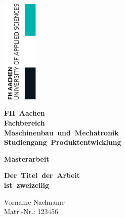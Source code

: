 \begin{titlepage}

	\thispagestyle{empty}

	\begin{flushright}
		\includegraphics[width=1.7cm]{./pic/FHAC.jpg}
	\end{flushright}

	\vspace{-2.5cm}

	\centering \bfseries \Large FH~Aachen \\
	\vspace{0.5cm}
	\normalsize Fachbereich\\
	Maschinenbau~und~Mechatronik \\
	Studiengang~Produktentwicklung

	\vspace{1cm}

	\centering \bfseries Masterarbeit

	\vspace{0.8cm}

	\centering \begin{minipage}[t]{17cm}
		\centering \bfseries \large Der~Titel~der~Arbeit\\ ist~zweizeilig
		\medskip
	\end{minipage}

	\vspace{1.5cm}

	\begin{minipage}[t]{9cm}
		\centering Vorname Nachname \\ Matr.-Nr.: 123456
	\end{minipage}


\end{titlepage}
